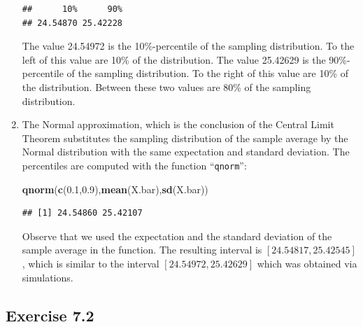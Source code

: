 \documentclass[
]{krantz}
\makeatletter
\newenvironment{Shaded}{\begin{snugshade}}{\end{snugshade}}
\newcommand{\FloatTok}[1]{\textcolor[rgb]{0.00,0.00,0.81}{#1}}
\newcommand{\KeywordTok}[1]{\textcolor[rgb]{0.13,0.29,0.53}{\textbf{#1}}}
\newcommand{\NormalTok}[1]{#1}
\newenvironment{kframe}{%
\medskip{}
\setlength{\fboxsep}{.8em}
 \def\at@end@of@kframe{}%
 \ifinner\ifhmode%
  \def\at@end@of@kframe{\end{minipage}}%
  \begin{minipage}{\columnwidth}%
 \fi\fi%
 \def\FrameCommand##1{\hskip\@totalleftmargin \hskip-\fboxsep
 \colorbox{shadecolor}{##1}\hskip-\fboxsep
     \hskip-\linewidth \hskip-\@totalleftmargin \hskip\columnwidth}%
 \MakeFramed {\advance\hsize-\width
   \@totalleftmargin\z@ \linewidth\hsize
   \@setminipage}}%
 {\par\unskip\endMakeFramed%
 \at@end@of@kframe}
\renewenvironment{Shaded}{\begin{kframe}}{\end{kframe}}
\theoremstyle{definition}
\theoremstyle{definition}
\theoremstyle{definition}
\theoremstyle{remark}
\makeatother
\begin{document}
\begin{enumerate}
\begin{verbatim}
##      10%      90% 
## 24.54870 25.42228
\end{verbatim}

  The value 24.54972 is the 10\%-percentile of the sampling distribution.
  To the left of this value are 10\% of the distribution. The value
  25.42629 is the 90\%-percentile of the sampling distribution. To the
  right of this value are 10\% of the distribution. Between these two
  values are 80\% of the sampling distribution.
\item
  The Normal approximation, which is
  the conclusion of the Central Limit Theorem substitutes the sampling
  distribution of the sample average by the Normal distribution with the
  same expectation and standard deviation. The percentiles are computed
  with the function ``\texttt{qnorm}'':

\begin{Shaded}
\begin{Highlighting}[]
\KeywordTok{qnorm}\NormalTok{(}\KeywordTok{c}\NormalTok{(}\FloatTok{0.1}\NormalTok{,}\FloatTok{0.9}\NormalTok{),}\KeywordTok{mean}\NormalTok{(X.bar),}\KeywordTok{sd}\NormalTok{(X.bar))}
\end{Highlighting}
\end{Shaded}

\begin{verbatim}
## [1] 24.54860 25.42107
\end{verbatim}

  Observe that we used the expectation and the standard deviation of the
  sample average in the function. The resulting interval is
  \([24.54817, 25.42545]\), which is similar to the interval
  \([24.54972, 25.42629]\) which was obtained via simulations.
\end{enumerate}

\hypertarget{exercise-7.2}{%
\subsection*{Exercise 7.2}\label{exercise-7.2}}
\end{document}
